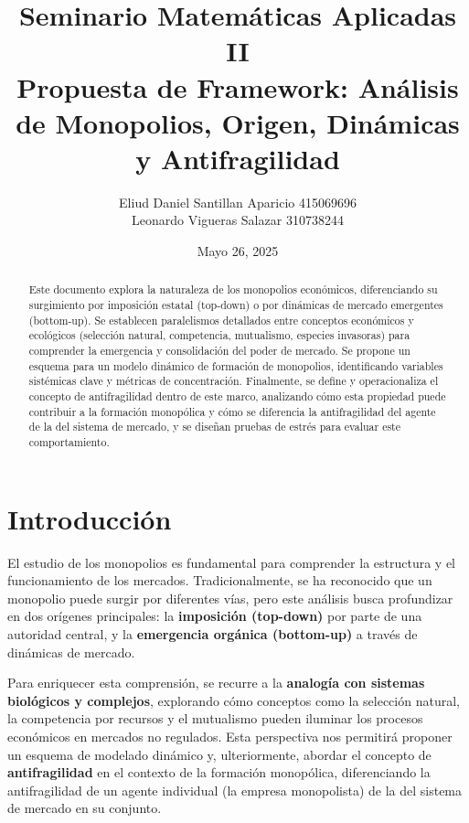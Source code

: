 \documentclass{article}
\title{Seminario Matemáticas Aplicadas II\\Propuesta de Framework: Análisis de Monopolios, Origen, Dinámicas y Antifragilidad}
\author{Eliud Daniel Santillan Aparicio 415069696 \\ Leonardo Vigueras Salazar 310738244}
\date{Mayo 26, 2025}
\begin{document}
\maketitle

\begin{abstract}
Este documento explora la naturaleza de los monopolios económicos, diferenciando su surgimiento por imposición estatal (top-down) o por dinámicas de mercado emergentes (bottom-up). Se establecen paralelismos detallados entre conceptos económicos y ecológicos (selección natural, competencia, mutualismo, especies invasoras) para comprender la emergencia y consolidación del poder de mercado. Se propone un esquema para un modelo dinámico de formación de monopolios, identificando variables sistémicas clave y métricas de concentración. Finalmente, se define y operacionaliza el concepto de antifragilidad dentro de este marco, analizando cómo esta propiedad puede contribuir a la formación monopólica y cómo se diferencia la antifragilidad del agente de la del sistema de mercado, y se diseñan pruebas de estrés para evaluar este comportamiento.
\end{abstract}

\tableofcontents

\newpage

\section{Introducción}

El estudio de los monopolios es fundamental para comprender la estructura y el funcionamiento de los mercados. Tradicionalmente, se ha reconocido que un monopolio puede surgir por diferentes vías, pero este análisis busca profundizar en dos orígenes principales: la \textbf{imposición (top-down)} por parte de una autoridad central, y la \textbf{emergencia orgánica (bottom-up)} a través de dinámicas de mercado.

Para enriquecer esta comprensión, se recurre a la \textbf{analogía con sistemas biológicos y complejos}, explorando cómo conceptos como la selección natural, la competencia por recursos y el mutualismo pueden iluminar los procesos económicos en mercados no regulados. Esta perspectiva nos permitirá proponer un esquema de modelado dinámico y, ulteriormente, abordar el concepto de \textbf{antifragilidad} en el contexto de la formación monopólica, diferenciando la antifragilidad de un agente individual (la empresa monopolista) de la del sistema de mercado en su conjunto.
\end{document}
